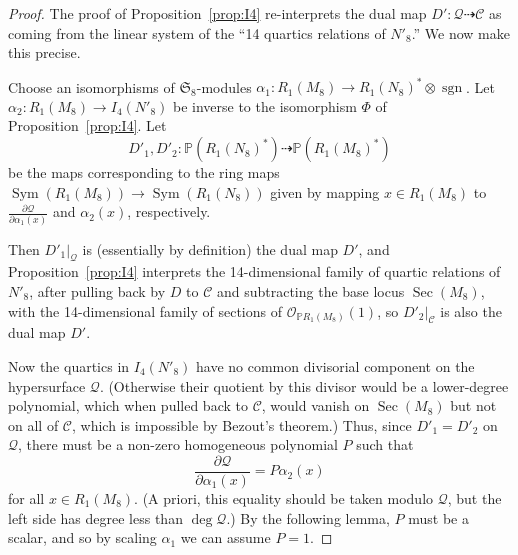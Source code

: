 \documentclass{amsart}
\theoremstyle{definition}
\theoremstyle{remark}
\DeclareMathOperator{\Sym}{Sym}
\DeclareMathOperator{\sgn}{sgn}
\DeclareMathOperator{\Sec}{Sec}
\def\SS{\mathfrak{S}}
\def\P{\mathbb{P}}
\def\proj{\mathbb{P}}
\def\cubic{\mathcal{C}}
\def\oh{\mathcal{O}}
\def\quintic{\mathcal{Q}}
\begin{document}
\begin{proof}
The proof of Proposition~\ref{prop:I4} re-interprets the dual map $D': \quintic \dashrightarrow \cubic$ as coming from the linear system of the ``14 quartics relations of $N'_8$.''
We now make this precise.

Choose an isomorphisms of $\SS_8$-modules
$\alpha_1:R_1(M_8) \to R_1(N_8)^* \otimes \sgn$.
Let $\alpha_2:R_1(M_8) \to I_4(N'_8)$ be inverse to the isomorphism $\Phi$ of Proposition~\ref{prop:I4}.
Let
\begin{displaymath}
D'_1, D'_2:\P(R_1(N_8)^*) \dashrightarrow \P(R_1(M_8)^*)
\end{displaymath}
be the maps corresponding to the ring maps $\Sym(R_1(M_8)) \to \Sym(R_1(N_8))$ given by mapping $x \in R_1(M_8)$ to
$\frac{\partial \quintic}{\partial \alpha_1(x)}$ and $\alpha_2(x)$, respectively.

Then $D'_1|_{\quintic}$ is (essentially by definition) the dual map $D'$, and Proposition~\ref{prop:I4} interprets the 14-dimensional family of quartic relations of $N'_8$, after pulling back by $D$ to $\cubic$ and subtracting the base locus $\Sec(M_8)$, with the 14-dimensional family of sections of $\oh_{\proj R_1(M_8)}(1)$, so $D'_2|_{\cubic}$ is also the dual map $D'$.

Now the quartics in $I_4(N'_8)$ have no common divisorial component on the hypersurface $\quintic$. (Otherwise
their quotient by this divisor would be a lower-degree polynomial, which when pulled back to $\cubic$, would vanish
on $\Sec(M_8)$ but not on all of $\cubic$, which is impossible by Bezout's theorem.)  Thus, since $D'_1=D'_2$ on $\quintic$, there
must be a non-zero homogeneous polynomial $P$ such that
\begin{equation}
\label{eq4}
\frac{\partial \quintic}{\partial \alpha_1(x)} = P \alpha_2(x)
\end{equation}
for all $x \in R_1(M_8)$.  (A priori, this equality should be taken modulo $\quintic$, but 
the left side has degree less than $\deg \quintic$.)  By the following lemma, $P$ must be a scalar, and so by scaling $\alpha_1$ we can assume $P=1$.


\end{proof}
\end{document}
